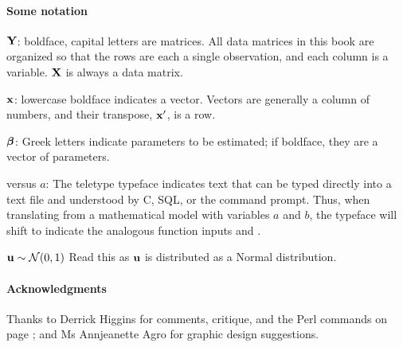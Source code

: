 \paragraph{Some notation}  \label{notation}\hfill

${\bf Y}$: boldface, capital letters are matrices. All data matrices in this
book are organized so that the rows are each a single observation, and
each column is a variable. ${\bf X}$ is always a data matrix.

${\bf x}$: lowercase boldface indicates a vector. Vectors are generally a
column of numbers, and their transpose, ${\bf x}'$, is a row.

${\mbox{\boldmath$\beta$}}$: Greek letters indicate parameters to be estimated;
if boldface, they are a vector of parameters.

 versus $a$: The teletype typeface indicates text
that can be typed directly into a text file and understood by C, SQL, or
the command prompt. Thus, when translating from a mathematical model
with variables $a$ and $b$, the typeface will shift to indicate the
analogous function inputs  and .

${\bf u} \sim {\cal N}(0,1)$ Read this as ${\bf u}$ is distributed as a Normal
distribution.



\paragraph{Acknowledgments} Thanks to Derrick Higgins for comments, critique, and
the Perl commands on page \pageref{dchperl}; and Ms Annjeanette Agro for
graphic design suggestions.









